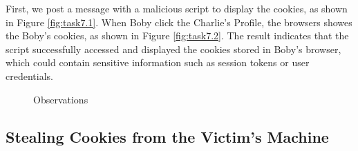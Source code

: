 \documentclass[a4paper,11pt]{article}
\begin{document}
First, we post a message with a malicious script to display the cookies, as shown in Figure \ref{fig:task7.1}. When Boby click the Charlie's Profile, the browsers showes the Boby's cookies, as shown in Figure \ref{fig:task7.2}. The result indicates that the script successfully accessed and displayed the cookies stored in Boby's browser, which could contain sensitive information such as session tokens or user credentials.
\begin{figure}[h]
    \centering
    \hfill
    \hfill
    \caption{Observations}\label{fig:task7}
\end{figure}

\subsection{Stealing Cookies from the Victim’s Machine}
\end{document}
